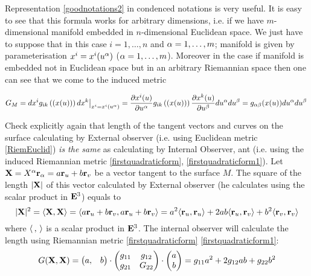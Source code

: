 \documentclass[12pt]{article}
\theoremstyle{theorem}
\numberwithin{equation}{section}
\begin{document}
{\footnotesize
Representation \eqref{goodnotations2} in condenced notations
is very useful. It is easy to see that this
formula 
 works for arbitrary dimensions, i.e. if we have
$m$-dimensional manifold embedded 
in $n$-dimensional Euclidean space.
We just have to suppose that in this case $i=1,\dots, n$ and $\alpha=1,\dots,m$;
manifold is given by parameterisation $x^i=x^i(u^\alpha)$ ($\alpha=1,\dots,m$).
Moreover in the case if manifold is embedded not in Euclidean space but in an arbitrary
Riemannian space then one can see 
that we come to the induced metric

   \begin{equation*}\label{RiemanianmetricofEuclideanspace3}
                 G_M=dx^i g_{ik}\left(\left(x(u)\right)\right)dx^k\big\vert_{x^i=x^i(u^\alpha)}=
                 {\partial x^i(u)\over \partial u^\alpha}
                 g_{ik}\left(\left(x(u)\right)\right)
                 {\partial x^k(u)\over \partial u^\beta}
                 du^\alpha du^\beta=g_{\alpha\beta}(x(u))du^\alpha du^\beta\,
                    \end{equation*}



}




Check explicitly again that  length of the tangent vectors and curves on the surface
calculating by External observer (i.e. using Euclidean metric \eqref{RiemEuclid})
{\it is the same} as calculating by Internal Observer, ant
(i.e. using the induced Riemannian metric \eqref{firstquadraticform}, \eqref{firstquadraticform1}).
 Let ${\bf X}=X^\alpha{\bf r}_\alpha=a{\bf r}_u+b{\bf r}_v$ be a vector tangent to the surface $M$.
  The square of the length $|{\bf X}|$ of this vector calculated by External observer
  (he calculates using the scalar product in ${\bf E}^3$) equals to
\begin{equation}\label{lengthforexternalobserver}
 |{\bf X}|^2=\langle{\bf X},{\bf X}\rangle=\langle a{\bf r}_u+b{\bf r}_v,a{\bf r}_u+b{\bf r}_v\rangle=a^2\langle{\bf r}_u,{\bf r}_u\rangle+
   2ab\langle{\bf r}_u,{\bf r}_v\rangle+b^2\langle{\bf r}_v,{\bf r}_v\rangle
\end{equation}
where $\langle\,,\,\rangle$ is a scalar product in ${\bf E}^3$.
The internal observer will calculate the length using Riemannian metric \eqref{firstquadraticform}
\eqref{firstquadraticform1}:
\begin{equation}\label{thevalueoffirstquadraticform}
  G({\bf X},{\bf X})=
  \begin{pmatrix}
   a, &b
  \end{pmatrix}
   \cdot
   \begin{pmatrix}
   g_{11} & g_{12} \\
   g_{21}& G_{22} \\
   \end{pmatrix}\cdot
  \begin{pmatrix}
   a\\ b\\
  \end{pmatrix}=
  g_{11}a^2+2g_{12}ab+g_{22}b^2
\end{equation}
\end{document}
